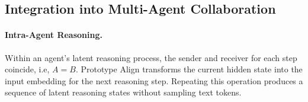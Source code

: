 \documentclass[11pt]{article}
\begin{document}

\subsection{Integration into Multi-Agent Collaboration}
\label{sec:agent_integration}
\paragraph{Intra-Agent Reasoning.} Within an agent’s latent reasoning process, the sender and receiver for each step coincide, i.e, $A=B$. Prototype Align transforms the current hidden state into the input embedding for the next reasoning step. Repeating this operation produces a sequence of latent reasoning states without sampling text tokens.
\end{document}
